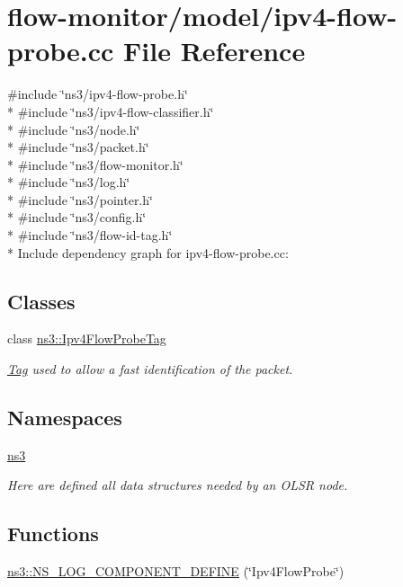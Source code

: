\hypertarget{ipv4-flow-probe_8cc}{}\section{flow-\/monitor/model/ipv4-\/flow-\/probe.cc File Reference}
\label{ipv4-flow-probe_8cc}
{\ttfamily \#include \char`\"{}ns3/ipv4-\/flow-\/probe.\+h\char`\"{}}\\*
{\ttfamily \#include \char`\"{}ns3/ipv4-\/flow-\/classifier.\+h\char`\"{}}\\*
{\ttfamily \#include \char`\"{}ns3/node.\+h\char`\"{}}\\*
{\ttfamily \#include \char`\"{}ns3/packet.\+h\char`\"{}}\\*
{\ttfamily \#include \char`\"{}ns3/flow-\/monitor.\+h\char`\"{}}\\*
{\ttfamily \#include \char`\"{}ns3/log.\+h\char`\"{}}\\*
{\ttfamily \#include \char`\"{}ns3/pointer.\+h\char`\"{}}\\*
{\ttfamily \#include \char`\"{}ns3/config.\+h\char`\"{}}\\*
{\ttfamily \#include \char`\"{}ns3/flow-\/id-\/tag.\+h\char`\"{}}\\*
Include dependency graph for ipv4-\/flow-\/probe.cc\+:
\subsection*{Classes}
\begin{DoxyCompactItemize}
\item 
class \hyperlink{classns3_1_1Ipv4FlowProbeTag}{ns3\+::\+Ipv4\+Flow\+Probe\+Tag}
\begin{DoxyCompactList}\small\item\em \hyperlink{classns3_1_1Tag}{Tag} used to allow a fast identification of the packet. \end{DoxyCompactList}\end{DoxyCompactItemize}
\subsection*{Namespaces}
\begin{DoxyCompactItemize}
\item 
 \hyperlink{namespacens3}{ns3}
\begin{DoxyCompactList}\small\item\em Here are defined all data structures needed by an O\+L\+SR node. \end{DoxyCompactList}\end{DoxyCompactItemize}
\subsection*{Functions}
\begin{DoxyCompactItemize}
\item 
\hyperlink{namespacens3_ad80c97a791ae822b9077f9cb98246dee}{ns3\+::\+N\+S\+\_\+\+L\+O\+G\+\_\+\+C\+O\+M\+P\+O\+N\+E\+N\+T\+\_\+\+D\+E\+F\+I\+NE} (\char`\"{}Ipv4\+Flow\+Probe\char`\"{})
\end{DoxyCompactItemize}
